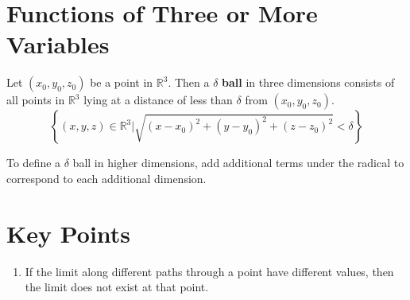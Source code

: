 \documentclass{article}
\begin{document}
\section*{Functions of Three or More Variables}
Let $(x_0, y_0, z_0)$ be a point in $\mathbb{R}^3$. Then a $\delta$ \textbf{ball} in three dimensions consists of all points in $\mathbb{R}^3$ lying at a distance of less than $\delta$ from $(x_0, y_0, z_0)$.
\[\left\{(x, y, z)\in\mathbb{R}^3 \Big| \sqrt{{(x-x_0)}^2+{(y-y_0)}^2+{(z-z_0)}^2}<\delta\right\}\]

To define a $\delta$ ball in higher dimensions, add additional terms under the radical to correspond to each additional dimension.

\section*{Key Points}
\begin{enumerate}
    \item If the limit along different paths through a point have different values, then the limit does not exist at that point.
\end{enumerate}
\end{document}
